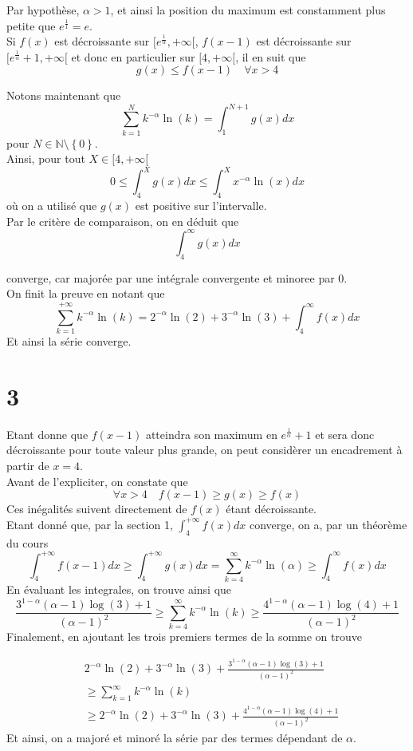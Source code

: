 \documentclass[11pt, a4paper]{article}
\begin{document}
Par hypothèse, $\alpha>1$, et ainsi la position du maximum est constamment plus petite que $e^{\frac{1}{1}}=e$.\\
Si $f( x) $ est décroissante sur $[e^{\frac{1}{\alpha}}, + \infty [ $, $f( x-1) $ est décroissante sur $[e^{\frac{1}{\alpha}}+1, + \infty [ $ et donc en particulier sur $[4, + \infty[ $, il en suit que
\[ 
	g( x) \leq f( x-1) \quad \forall x > 4 
\]


Notons maintenant que
\[ 
	\sum_{k=1}^{ N } k^{-\alpha}\ln( k) = \int_{ 1 }^{ N+1  } g( x) dx
\]
pour $N \in \mathbb{N}\setminus \left\{ 0 \right\} $.\\
Ainsi, pour tout $X \in [4, + \infty[$ 
\[ 
0 \leq	\int_{ 4 }^{ X }g( x) dx \leq \int_{ 4 }^{ X }x^{-\alpha}\ln( x) dx 
\]
où on a utilisé que $g( x) $ est positive sur l'intervalle.\\
Par le critère de comparaison, on en déduit que
\[ 
	\int_{ 4 }^{ \infty  } g( x) dx 
\]

converge, car majorée par une intégrale convergente et minoree par 0.\\
On finit la preuve en notant que
\[ 
	\sum_{k=1}^{ + \infty } k^{-\alpha}\ln( k) = 2^{-\alpha}\ln( 2) + 3^{-\alpha}\ln( 3) +\int_{ 4 }^{ \infty  }f( x) dx
\]
Et ainsi la série converge.
\section*{3}
Etant donne que $f( x-1) $ atteindra son maximum en $e^{\frac{1}{\alpha}}+1$ et sera donc décroissante pour toute valeur plus grande, on peut considèrer un encadrement à partir de $x=4$.\\
Avant de l'expliciter, on constate que
\[ 
	\forall x>4\quad f( x-1) \geq g( x) \geq f(x) 
\]
Ces inégalités suivent directement de $f( x)  $ étant décroissante.\\

Etant donné que, par la section 1, $ \int_{ 4 }^{ + \infty  }f( x) dx$ converge, on a, par un théorème du cours
\[ 
	\int_{ 4 }^{ + \infty  } f( x-1) dx \geq \int_{ 4 }^{ + \infty  }g( x) dx = \sum_{k=4}^{ \infty } k^{-\alpha} \ln( \alpha) \geq \int_{ 4 }^{ \infty  }f( x) dx
\]
En évaluant les integrales, on trouve ainsi que
\[ 
	\frac{3^{1-\alpha}( \alpha-1) \log( 3) +1}{( \alpha-1) ^{2}} \geq\sum_{k=4}^{ \infty } k^{-\alpha} \ln( k)\geq \frac{4^{1-\alpha}( \alpha-1) \log( 4) +1}{( \alpha-1) ^{2}} 
\]
Finalement, en ajoutant les trois premiers termes de la somme on trouve

\begin{align*}
	&2^{-\alpha}\ln( 2) + 3^{-\alpha}\ln( 3)  + \frac{3^{1-\alpha}( \alpha-1) \log( 3) +1}{( \alpha-1) ^{2}}\\
	&\geq\sum_{k=1}^{ \infty } k^{-\alpha} \ln( k)\\
	&\geq 2^{-\alpha}\ln( 2)+ 3^{-\alpha}\ln( 3) +\frac{4^{1-\alpha}( \alpha-1) \log( 4) +1}{( \alpha-1) ^{2}} 
\end{align*}
Et ainsi, on a majoré et minoré la série par des termes dépendant de $\alpha$.
\end{document}
